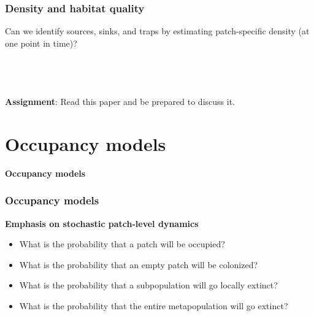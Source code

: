 \documentclass[color=usenames,dvipsnames]{beamer}\usepackage[]{graphicx}\usepackage[]{color}
\begin{document}
\begin{frame}
  \frametitle{Density and habitat quality}
  Can we identify sources, sinks, and traps by estimating
  patch-specific density (at one point in time)? \\
  \pause
  \vfill
  \begin{columns}
    \wide
    \centering
     \\
  \end{columns}
  \vfill
  \centering
  \large
  \alert{\bf Assignment}: Read this paper and be prepared to discuss it. \\
\end{frame}




\section{Occupancy models}


\begin{frame}[plain]
  \Huge
  \centering
  \vfill
  \bf 
  \color{MidnightBlue}
  Occupancy models \\
  \vfill
\end{frame}


\begin{frame}[fragile]
  \frametitle{Occupancy models}
  \large
  {\bf Emphasis on stochastic patch-level dynamics}
  \begin{itemize}[<+->]
    \item What is the probability that a patch will be occupied?
    \item What is the probability that an empty patch will be colonized?
    \item What is the probability that a subpopulation will go locally extinct?
    \item What is the probability that the entire metapopulation will
      go extinct?
  \end{itemize}
\end{frame}
\end{document}

